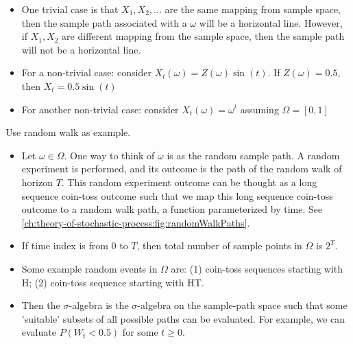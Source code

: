 \begin{refsection}
\begin{remark}\hfill
\begin{itemize}
    \item One trivial case is that $X_1,X_2,...$ are the same mapping from sample space, then the sample path associated with a $\omega$ will be a horizontal line. However, if $X_1,X_2$ are different mapping from the sample space, then the sample path will not be a horizontal line. 
    \item For a non-trivial case: consider $X_t(\omega) = Z(\omega)\sin(t)$. If $Z(\omega)=0.5$, then $X_t = 0.5\sin(t)$
    \item For another non-trivial case: consider $X_t(\omega) = \omega^t$ assuming $\Omega=[0,1]$
\end{itemize}
\end{remark}

\begin{note}\cite[97]{shreve2004stochastic2}\label{ch:theory-of-stochastic-process:remark:interpretationonsamplespaceandsigmaalgebra}\hfill
	Use random walk as example.
	\begin{itemize}
		\item Let $\omega \in \Omega$. One way to think of $\omega$ is as the random sample path. A random experiment is performed, and its outcome is the path of the random walk of horizon $T$. This random experiment outcome can be thought as a long sequence coin-toss outcome such that we map this long sequence coin-toss outcome to a random walk path, a function parameterized by time. See \autoref{ch:theory-of-stochastic-process:fig:randomWalkPaths}.
		\item If time index is from 0 to $T$, then total number of sample points in $\Omega$ is $2^T$.
		\item Some example random events in $\Omega$ are: (1) coin-toss sequences starting with H; (2) coin-toss sequence starting with HT.
		\item Then the $\sigma$-algebra is the $\sigma$-algebra on the sample-path space such that some 'suitable' subsets of all possible paths can be evaluated. For example, we can evaluate $P(W_t < 0.5)$ for some $t\geq 0$.
	\end{itemize}
\end{note}



\end{refsection}
